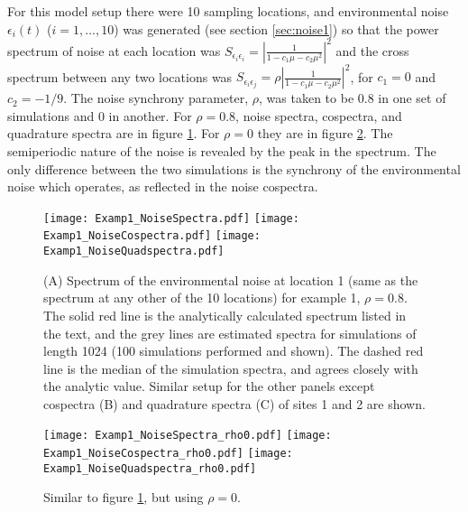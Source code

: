 \documentclass[letterpaper,11pt]{article}
\begin{document}
For this model setup there were 10 sampling locations, and environmental noise $\epsilon_i(t)$
($i=1,\ldots,10$) was generated
(see section \ref{sec:noise1}) so that the power spectrum of noise at each location was 
$S_{\epsilon_i \epsilon_i} = \left| \frac{1}{1-c_1 \mu -c_2 \mu^2} \right|^2$ and
the cross spectrum between any two locations was 
$S_{\epsilon_i \epsilon_j}=\rho \left| \frac{1}{1-c_1 \mu -c_2 \mu^2} \right|^2$, for $c_1=0$ and $c_2=-1/9$. The noise synchrony parameter, $\rho$, was taken to be 
$0.8$ in one set of simulations and $0$ in another. For $\rho=0.8$, 
noise spectra, cospectra, and quadrature spectra are in figure \ref{fig:example1_noise_spectra_rho0p8}. 
For $\rho=0$ they are in figure \ref{fig:example1_noise_spectra_rho0}.
The semiperiodic nature of the noise
is revealed by the peak in the spectrum.
The only difference between the two simulations is the synchrony of the 
environmental noise which operates, as reflected in the noise cospectra.

\begin{figure}
\texttt{[image: Examp1\_NoiseSpectra.pdf]}
\texttt{[image: Examp1\_NoiseCospectra.pdf]}
\texttt{[image: Examp1\_NoiseQuadspectra.pdf]}
\caption{(A) Spectrum of the environmental noise at location 1 (same as the spectrum at any other of the 10 locations) for example 1, $\rho=0.8$. The solid red line is the analytically calculated spectrum listed in the text, and the grey lines are estimated spectra for simulations of length 1024 (100 simulations performed and shown). The dashed red line is the median of the simulation spectra, and agrees closely with the analytic value. Similar setup for
 the other panels except cospectra (B) and quadrature spectra (C) of sites 1 and 2 are shown. }\label{fig:example1_noise_spectra_rho0p8}
\end{figure}

\begin{figure}
\texttt{[image: Examp1\_NoiseSpectra\_rho0.pdf]}
\texttt{[image: Examp1\_NoiseCospectra\_rho0.pdf]}
\texttt{[image: Examp1\_NoiseQuadspectra\_rho0.pdf]}
\caption{Similar to figure \ref{fig:example1_noise_spectra_rho0p8}, but using $\rho=0$.}\label{fig:example1_noise_spectra_rho0}
\end{figure}
\end{document}
